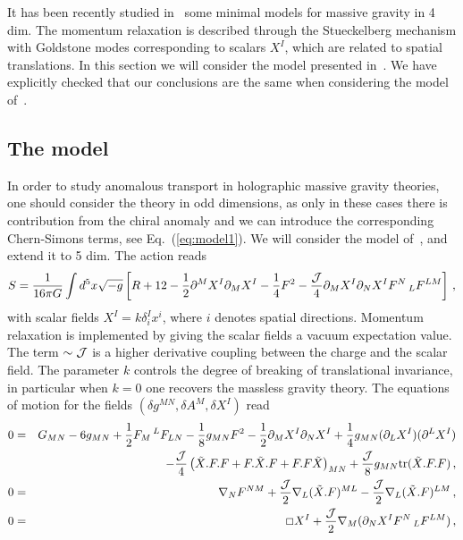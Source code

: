 \documentclass[a4paper]{jpconf}
\begin{document}
It has been recently studied in~\cite{Baggioli:2016oqk,Gouteraux:2016wxj} some minimal models for massive gravity in 4 dim. The momentum relaxation is described through the Stueckelberg mechanism with Goldstone modes corresponding to scalars $X^I$, which are related to spatial translations. In this section we will consider the model presented in~\cite{Gouteraux:2016wxj}. We have explicitly checked that our conclusions are the same when considering the model of~\cite{Baggioli:2016oqk}.



\subsection{The model}
\label{subsec:model}

In order to study anomalous transport in holographic massive gravity theories, one should consider the theory in odd dimensions, as only in these cases there is contribution from the chiral anomaly and we can introduce the corresponding Chern-Simons terms, see Eq.~(\ref{eq:model1}). We will consider the model of~\cite{Gouteraux:2016wxj}, and extend it to 5 dim. The action reads
\begin{equation}
 S = \frac{1}{16\pi G} \int d^5x \sqrt{-g} \left[ R + 12 - \frac 1 2 \partial^M X^I \partial_M X^I - \frac 1 4 F^2 - \frac {\cal J} 4 \partial_M X^I \partial_N X^I F^N\,_L F^{L M}  \right] \,, \label{eq:massive_gravity}
\end{equation}
with scalar fields $X^I = k \delta^I_i x^i$, where $i$ denotes spatial directions. Momentum relaxation is implemented by giving the scalar fields a vacuum expectation value. The term $\sim {\cal J}$ is a higher derivative coupling between the charge and the scalar field. The parameter $k$ controls the degree of breaking of translational invariance, in particular when $k=0$ one recovers the massless gravity theory. The equations of motion for the fields $(\delta g^{MN}, \delta A^M, \delta X^I)$ read
\begin{eqnarray}
 0 &=& G_{MN}-6 g_{MN} + \frac{1}{2} F_{M}{}\,^L F_{L N} - \frac{1}{8} g_{MN} F^2 - \frac{1}{2} \partial_M X^I\partial_N X^I +
\frac 1 4 g_{MN} (\partial_L X^I)(\partial^L X^I) \nonumber \\
&&- \frac {\cal J} 4 \left(\tilde X.F.F+F.\tilde X.F+ F.F\tilde X \right)_{MN} 
+ \frac {\cal J} 8 g_{MN} \mathrm{tr}(\tilde X.F.F) \,, \label{eq:eomg} \\
0 &=& \nabla_N F^{NM} + \frac {\cal J} 2 \nabla_L(\tilde X . F)^{ML} - \frac {\cal J} 2 \nabla_L(\tilde X. F)^{LM} \,,  \label{eq:eomA}\\
0 &=& \Box X^I + \frac{{\cal J}}{2} \nabla_M ( \partial_N X^I F^N\,_L F^{LM})\,,  \label{eq:eomX}
\end{eqnarray}
\end{document}
